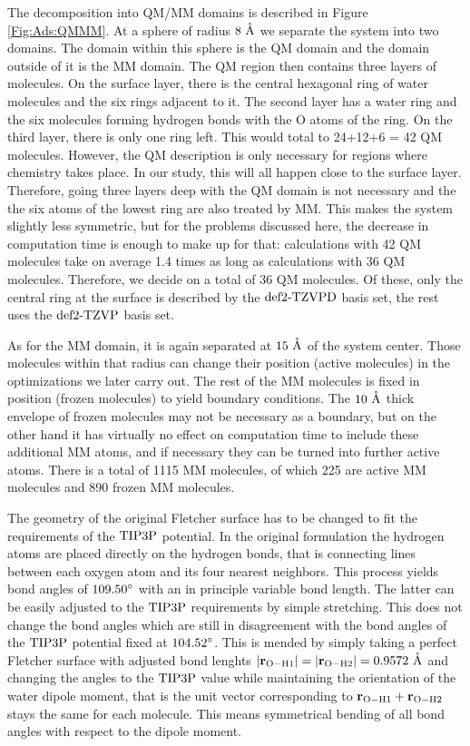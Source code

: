 The decomposition into QM/MM domains is described in Figure \ref{Fig:Ads:QMMM}.
At a sphere of radius $8~\mathring{\text{A}}$ we separate the system into two domains. The
domain within this sphere is the QM domain and the domain outside of it
is the MM domain. 
The QM region then contains three layers of molecules. On the surface layer,
there is the central hexagonal ring of water molecules and the six
rings adjacent to it. The second layer has a water ring and the six
molecules forming hydrogen bonds with the O atoms of the ring. On 
the third layer, there is only one ring left. This would total
to 24+12+6 = 42 QM molecules. However, the QM description is only
necessary for regions where chemistry takes place. In our study,
this will all happen close to the surface layer. Therefore, going three
layers deep with the QM domain is not necessary and the the six
atoms of the lowest ring are also treated by MM. This makes the system slightly
less symmetric, but for the problems discussed here, the decrease in
computation time is enough to make up for that: calculations with 42 QM molecules
take on average 1.4 times as long as calculations with 36 QM molecules.
Therefore, we decide on a total of 36 QM molecules. Of these, only the central ring at
the surface is described by the $\text{def2-TZVPD}$ basis set, the rest
uses the $\text{def2-TZVP}$ basis set. 

As for the MM domain, it is again separated at $15~\mathring{\text{A}}$ of the system center.
Those molecules within that radius can change their position (active molecules) in the optimizations we
later carry out. The rest of the MM molecules is fixed in position (frozen molecules) to yield
boundary conditions. The $10~\mathring{\text{A}}$ thick envelope of frozen molecules may not be
necessary as a boundary, but on the other hand it has virtually no effect on
computation time to include these additional MM atoms, and if necessary they
can be turned into further active atoms. There is a total of 1115 MM molecules,
of which 225 are active MM molecules and 890 frozen MM molecules.

The geometry of the original Fletcher surface has to be changed to fit the requirements
of the $\text{TIP3P}$ potential. In the original formulation the hydrogen atoms
are placed directly on the hydrogen bonds, that is connecting lines between each oxygen atom
and its four nearest neighbors. This process yields bond angles of $109.50\degree$
with an in principle variable bond length. The latter can be easily adjusted
to the $\text{TIP3P}$ requirements by simple stretching. This does not change the bond angles which
are still in disagreement with the bond angles of the $\text{TIP3P}$ potential
fixed at $104.52\degree$. This is mended by simply taking a perfect
Fletcher surface with adjusted bond lenghts $\left|{\mathbf{r}_{\text O - \text H1}}\right|=\left|{\mathbf{r}_{\text O - \text H2}}\right|=0.9572~\mathring{\text{A}}$
and changing the angles to the $\text{TIP3P}$ value while maintaining
the orientation of the water dipole moment, that is the unit vector
corresponding to $\mathbf{r}_{\text O - \text H1}+\mathbf{r}_{\text O - \text H2}$ stays
the same for each molecule. This means symmetrical bending of all bond angles
with respect to the dipole moment.

